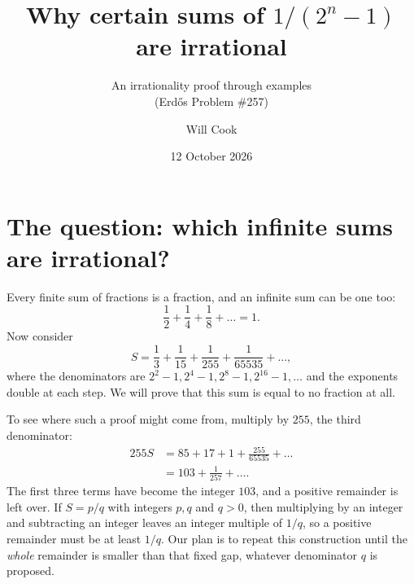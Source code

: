 \documentclass[10pt]{article}
\title{Why certain sums of $1/(2^n-1)$ are irrational}
\subtitle{An irrationality proof through examples\\ (Erd\H{o}s Problem \#257)}
\author{Will Cook}
\date{12 October 2026}
\theoremstyle{plain}
\theoremstyle{definition}
\theoremstyle{remark}
\begin{document}
\maketitle
{}

\section{The question: which infinite sums are irrational?}\label{sec:intro}

Every finite sum of fractions is a fraction, and an infinite sum can be
one too:
\[
 \frac12+\frac14+\frac18+\dots=1.
\]
Now consider
\[
 S=\frac13+\frac1{15}+\frac1{255}+\frac1{65535}+\dots,
\]
where the denominators are $2^2-1,2^4-1,2^8-1,2^{16}-1,\dots$ and the
exponents double at each step. We will prove that this sum is equal to
no fraction at all.

To see where such a proof might come from, multiply by $255$, the third
denominator:
\[
\begin{aligned}
 255S&=85+17+1+\frac{255}{65535}+\dots\\
     &=103+\frac1{257}+\dots.
\end{aligned}
\]
The first three terms have become the integer $103$, and a positive
remainder is left over. If $S=p/q$ with integers $p,q$ and $q>0$, then
multiplying by an integer and subtracting an integer leaves an integer
multiple of $1/q$, so a positive remainder must be at least $1/q$. Our
plan is to repeat this construction until the \emph{whole} remainder is
smaller than that fixed gap, whatever denominator $q$ is proposed.
\end{document}
